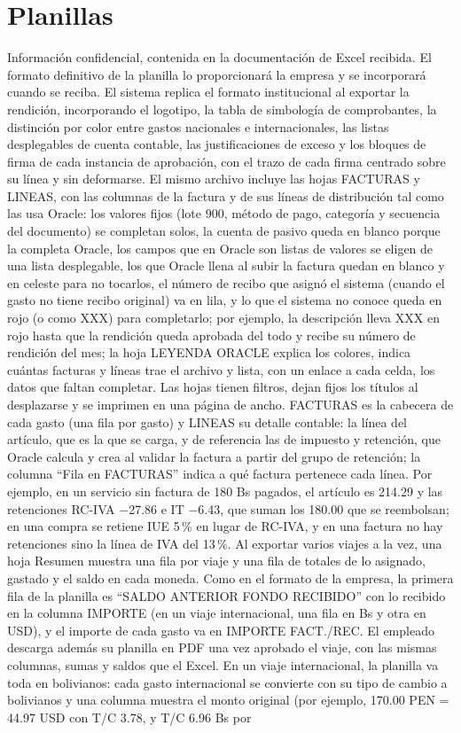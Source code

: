 \documentclass[11pt,letterpaper]{article}
\begin{document}
\section{Planillas}
Información confidencial, contenida en la documentación de Excel recibida. El formato definitivo de la planilla lo proporcionará la empresa y se incorporará cuando se reciba. El sistema replica el formato institucional al exportar la rendición, incorporando el logotipo, la tabla de simbología de comprobantes, la distinción por color entre gastos nacionales e internacionales, las listas desplegables de cuenta contable, las justificaciones de exceso y los bloques de firma de cada instancia de aprobación, con el trazo de cada firma centrado sobre su línea y sin deformarse. El mismo archivo incluye las hojas FACTURAS y LINEAS, con las columnas de la factura y de sus líneas de distribución tal como las usa Oracle: los valores fijos (lote 900, método de pago, categoría y secuencia del documento) se completan solos, la cuenta de pasivo queda en blanco porque la completa Oracle, los campos que en Oracle son listas de valores se eligen de una lista desplegable, los que Oracle llena al subir la factura quedan en blanco y en celeste para no tocarlos, el número de recibo que asignó el sistema (cuando el gasto no tiene recibo original) va en lila, y lo que el sistema no conoce queda en rojo (o como XXX) para completarlo; por ejemplo, la descripción lleva XXX en rojo hasta que la rendición queda aprobada del todo y recibe su número de rendición del mes; la hoja LEYENDA ORACLE explica los colores, indica cuántas facturas y líneas trae el archivo y lista, con un enlace a cada celda, los datos que faltan completar. Las hojas tienen filtros, dejan fijos los títulos al desplazarse y se imprimen en una página de ancho. FACTURAS es la cabecera de cada gasto (una fila por gasto) y LINEAS su detalle contable: la línea del artículo, que es la que se carga, y de referencia las de impuesto y retención, que Oracle calcula y crea al validar la factura a partir del grupo de retención; la columna ``Fila en FACTURAS'' indica a qué factura pertenece cada línea. Por ejemplo, en un servicio sin factura de 180 Bs pagados, el artículo es 214.29 y las retenciones RC-IVA $-$27.86 e IT $-$6.43, que suman los 180.00 que se reembolsan; en una compra se retiene IUE 5\,\% en lugar de RC-IVA, y en una factura no hay retenciones sino la línea de IVA del 13\,\%. Al exportar varios viajes a la vez, una hoja Resumen muestra una fila por viaje y una fila de totales de lo asignado, gastado y el saldo en cada moneda. Como en el formato de la empresa, la primera fila de la planilla es ``SALDO ANTERIOR FONDO RECIBIDO'' con lo recibido en la columna IMPORTE (en un viaje internacional, una fila en Bs y otra en USD), y el importe de cada gasto va en IMPORTE FACT./REC. El empleado descarga además su planilla en PDF una vez aprobado el viaje, con las mismas columnas, sumas y saldos que el Excel. En un viaje internacional, la planilla va toda en bolivianos: cada gasto internacional se convierte con su tipo de cambio a bolivianos y una columna muestra el monto original (por ejemplo, 170.00 PEN = 44.97 USD con T/C 3.78, y T/C 6.96 Bs por 
\end{document}
